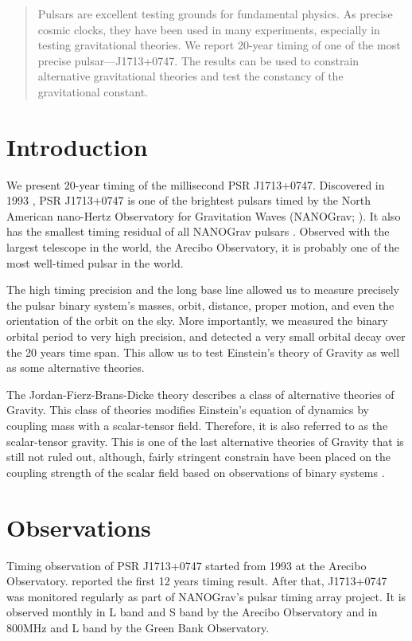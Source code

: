 
\begin{abstract}
Pulsars are excellent testing grounds for fundamental physics. As precise
cosmic clocks, they have been used in many experiments, especially in testing
gravitational theories. We report 20-year timing of one of the most precise
pulsar---J1713+0747. The results can be used to constrain alternative
gravitational theories and test the constancy of the gravitational constant.
\end{abstract}


\section{Introduction}
We present 20-year timing of the millisecond  PSR J1713+0747. Discovered in
1993 \citep{fwc93}, PSR J1713+0747 is one of the brightest pulsars timed by the
North American nano-Hertz Observatory for Gravitation Waves (NANOGrav;
\citealt{ndf+12, dfg+13}). It also has the smallest timing residual of all NANOGrav pulsars \citep{dfg+13}. Observed with the largest telescope in the world, the Arecibo Observatory, it is probably one of the most well-timed pulsar in the world.

The high timing precision and the long base line allowed us to measure precisely
the pulsar binary system's  masses, orbit, distance, proper motion, and even
the orientation of the orbit on the sky. More importantly, 
we measured the binary orbital period to very high precision, and detected a
very small orbital decay over the 20 years time span. This allow us to test
Einstein's theory of Gravity as well as some alternative theories.


The Jordan-Fierz-Brans-Dicke theory \citep{jor59,fie56,bd61} describes a class of alternative theories of Gravity. 
This class of theories modifies Einstein's equation of dynamics by coupling
mass with a scalar-tensor
field. Therefore, it is also referred to as the scalar-tensor gravity. 
This is one of the last alternative theories of Gravity that is still not
ruled out, although, fairly stringent constrain have been placed on the coupling
strength of the scalar field based on observations of binary systems
\citep{hmb10, lwj+09, fwe+12}.


\section{Observations}
Timing observation of PSR J1713+0747 started from 1993 at the Arecibo
Observatory. \citet{sns+05} reported the first 12 years timing result. After
that, J1713+0747 was monitored regularly as part of  NANOGrav's pulsar timing
array project. It is observed monthly in L band and S band by the Arecibo Observatory and in 800MHz and L band by the Green Bank Observatory.

